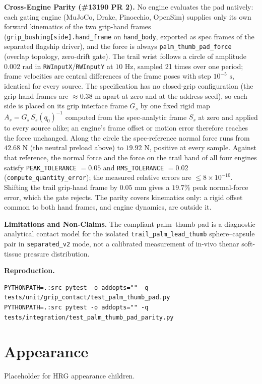 \documentclass[11pt,a4paper]{article}
\begin{document}
\textbf{Cross-Engine Parity (\#13190 PR 2).} No engine evaluates the pad natively: each gating engine (MuJoCo, Drake, Pinocchio, OpenSim) supplies only its own forward kinematics of the two grip-hand frames (\texttt{grip\_bushing[side].hand\_frame} on \texttt{hand\_body}, exported as spec frames of the separated flagship driver), and the force is always \texttt{palm\_thumb\_pad\_force} (overlap topology, zero-drift gate). The trail wrist follows a circle of amplitude $0.002\text{ rad}$ in \texttt{RWInputX}/\texttt{RWInputY} at $10\text{ Hz}$, sampled 21 times over one period; frame velocities are central differences of the frame poses with step $10^{-5}\text{ s}$, identical for every source. The specification has no closed-grip configuration (the grip-hand frames are $\approx 0.38\text{ m}$ apart at zero and at the address seed), so each side is placed on its grip interface frame $G_s$ by one fixed rigid map $A_s = G_s\,S_s(q_0)^{-1}$ computed from the spec-analytic frame $S_s$ at zero and applied to every source alike; an engine's frame offset or motion error therefore reaches the force unchanged. Along the circle the spec-reference normal force runs from $42.68\text{ N}$ (the neutral preload above) to $19.92\text{ N}$, positive at every sample. Against that reference, the normal force and the force on the trail hand of all four engines satisfy \texttt{PEAK\_TOLERANCE} $= 0.05$ and \texttt{RMS\_TOLERANCE} $= 0.02$ (\texttt{compute\_quantity\_error}); the measured relative errors are $\le 8\times 10^{-10}$. Shifting the trail grip-hand frame by $0.05\text{ mm}$ gives a $19.7\%$ peak normal-force error, which the gate rejects. The parity covers kinematics only: a rigid offset common to both hand frames, and engine dynamics, are outside it.

\textbf{Limitations and Non-Claims.} The compliant palm--thumb pad is a diagnostic analytical contact model for the isolated \texttt{trail\_palm\_lead\_thumb} sphere--capsule pair in \texttt{separated\_v2} mode, not a calibrated measurement of in-vivo thenar soft-tissue pressure distribution.

\textbf{Reproduction.}
\begin{verbatim}
PYTHONPATH=.:src pytest -o addopts="" -q tests/unit/grip_contact/test_palm_thumb_pad.py
PYTHONPATH=.:src pytest -o addopts="" -q tests/integration/test_palm_thumb_pad_parity.py
\end{verbatim}

\section{Appearance}
Placeholder for HRG appearance children.
\end{document}
